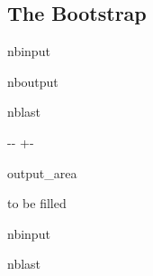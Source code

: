 \documentclass[a4paper,11pt,openany,english]{sphinxmanual}
\begin{document}
\subsection{The Bootstrap}
\label{\detokenize{notebooks/bootstrap:The-Bootstrap}}\label{\detokenize{notebooks/bootstrap::doc}}
\begin{sphinxuseclass}{nbinput}
{
\begin{sphinxVerbatim}[commandchars=\\\{\}]
\llap{\color{nbsphinxin}[1]:\,\hspace{\fboxrule}\hspace{\fboxsep}}
\end{sphinxVerbatim}
}

\end{sphinxuseclass}
\begin{sphinxuseclass}{nboutput}
\begin{sphinxuseclass}{nblast}
{

\kern-\sphinxverbatimsmallskipamount\kern-\baselineskip
\kern+\FrameHeightAdjust\kern-\fboxrule
\vspace{\nbsphinxcodecellspacing}

\begin{sphinxuseclass}{output_area}
\begin{sphinxuseclass}{}


\begin{sphinxVerbatim}[commandchars=\\\{\}]
to be filled
\end{sphinxVerbatim}



\end{sphinxuseclass}
\end{sphinxuseclass}
}

\end{sphinxuseclass}
\end{sphinxuseclass}
\begin{sphinxuseclass}{nbinput}
\begin{sphinxuseclass}{nblast}
{
\begin{sphinxVerbatim}[commandchars=\\\{\}]
\llap{\color{nbsphinxin}[ ]:\,\hspace{\fboxrule}\hspace{\fboxsep}}
\end{sphinxVerbatim}
}

\end{sphinxuseclass}
\end{sphinxuseclass}
\sphinxstepscope
\end{document}
